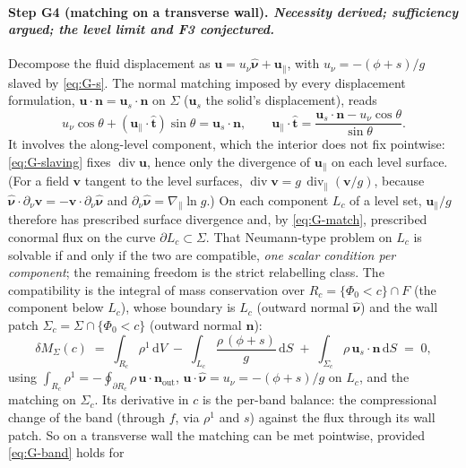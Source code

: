\documentclass[11pt]{article}
\newcommand{\bu}{\mathbf{u}}
\newcommand{\bn}{\mathbf{n}}
\newcommand{\dS}{\,\mathrm{d}S}
\newcommand{\dV}{\,\mathrm{d}V}
\newcommand{\Div}{\operatorname{div}}
\newcommand{\nuh}{\hat{\boldsymbol{\nu}}}
\begin{document}
\paragraph{Step G4 (matching on a transverse wall). \emph{Necessity
derived; sufficiency argued; the level limit and F3 conjectured.}}
Decompose the fluid displacement as $\bu = u_\nu\nuh + \bu_\parallel$,
with $u_\nu = -(\phi + s)/g$ slaved by \eqref{eq:G-s}. The normal
matching imposed by every displacement formulation,
$\bu\cdot\bn = \bu_s\cdot\bn$ on $\Sigma$ ($\bu_s$ the solid's
displacement), reads
\begin{equation}
  u_\nu\cos\theta + (\bu_\parallel\cdot\hat{\mathbf t})\sin\theta
  = \bu_s\cdot\bn ,
  \qquad
  \bu_\parallel\cdot\hat{\mathbf t}
  = \frac{\bu_s\cdot\bn - u_\nu\cos\theta}{\sin\theta} .
  \label{eq:G-match}
\end{equation}
It involves the along-level component, which the interior does not fix
pointwise: \eqref{eq:G-slaving} fixes $\Div\bu$, hence only the
divergence of $\bu_\parallel$ on each level surface. (For a field
$\mathbf v$ tangent to the level surfaces,
$\Div\mathbf v = g\,\Div_{\parallel}(\mathbf v/g)$, because
$\nuh\cdot\partial_\nu\mathbf v = -\mathbf v\cdot\partial_\nu\nuh$ and
$\partial_\nu\nuh = \nabla_{\!\parallel}\ln g$.) On each component
$L_c$ of a level set, $\bu_\parallel/g$ therefore has prescribed surface
divergence and, by \eqref{eq:G-match}, prescribed conormal flux on the
curve $\partial L_c \subset \Sigma$. That Neumann-type problem on $L_c$
is solvable if and only if the two are compatible, \emph{one scalar
condition per component}; the remaining freedom is the strict
relabelling class. The compatibility is the integral of mass
conservation over $R_c = \{\Phi_0 < c\}\cap F$ (the component below
$L_c$), whose boundary is $L_c$ (outward normal $\nuh$) and the wall
patch $\Sigma_c = \Sigma\cap\{\Phi_0 < c\}$ (outward normal $\bn$):
\begin{equation}
  \delta M_\Sigma(c) \;=\; \int_{R_c}\rho^1\dV
  \;-\; \int_{L_c}\frac{\rho\,(\phi + s)}{g}\dS
  \;+\; \int_{\Sigma_c}\rho\,\bu_s\cdot\bn\dS \;=\; 0 ,
  \label{eq:G-band}
\end{equation}
using $\int_{R_c}\rho^1 = -\oint_{\partial R_c}\rho\,\bu\cdot\bn_{\text{out}}$,
$\bu\cdot\nuh = u_\nu = -(\phi+s)/g$ on $L_c$, and the matching on
$\Sigma_c$. Its derivative in $c$ is the per-band balance:
the compressional change of the band (through $f$, via $\rho^1$ and
$s$) against the flux through its wall patch. So on a transverse wall
the matching can be met pointwise, provided \eqref{eq:G-band} holds for
\end{document}
